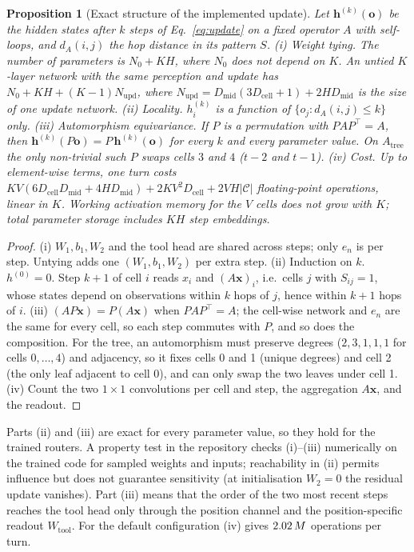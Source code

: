 \documentclass[10pt,twocolumn,letterpaper]{article}
\newtheorem{proposition}{Proposition}
\begin{document}
\begin{proposition}[Exact structure of the implemented update]\label{prop:structure}
Let $\mathbf h^{(k)}(\mathbf o)$ be the hidden states after $k$ steps of Eq.~\eqref{eq:update} on a fixed operator $A$ with self-loops, and $d_A(i,j)$ the hop distance in its pattern $S$.
(i) \emph{Weight tying.} The number of parameters is $N_0 + KH$, where $N_0$ does not depend on $K$. An untied $K$-layer network with the same perception and update has $N_0 + KH + (K{-}1)N_{\text{upd}}$, where $N_{\text{upd}} = D_{\text{mid}}(3D_{\text{cell}}+1) + 2H D_{\text{mid}}$ is the size of one update network.
(ii) \emph{Locality.} $h_i^{(k)}$ is a function of $\{o_j : d_A(i,j)\le k\}$ only.
(iii) \emph{Automorphism equivariance.} If $P$ is a permutation with $PAP^{\top}=A$, then $\mathbf h^{(k)}(P\mathbf o) = P\,\mathbf h^{(k)}(\mathbf o)$ for every $k$ and every parameter value. On $A_{\text{tree}}$ the only non-trivial such $P$ swaps cells $3$ and $4$ ($t{-}2$ and $t{-}1$).
(iv) \emph{Cost.} Up to element-wise terms, one turn costs $K V (6D_{\text{cell}}D_{\text{mid}} + 4HD_{\text{mid}}) + 2KV^2 D_{\text{cell}} + 2VH|\mathcal C|$ floating-point operations, linear in $K$. Working activation memory for the $V$ cells does not grow with $K$; total parameter storage includes $KH$ step embeddings.
\end{proposition}
\begin{proof}
(i) $W_1,b_1,W_2$ and the tool head are shared across steps; only $e_n$ is per step. Untying adds one $(W_1,b_1,W_2)$ per extra step. (ii) Induction on $k$. $h^{(0)}=0$. Step $k{+}1$ of cell $i$ reads $x_i$ and $(A\mathbf x)_i$, i.e.\ cells $j$ with $S_{ij}=1$, whose states depend on observations within $k$ hops of $j$, hence within $k{+}1$ hops of $i$. (iii) $(A P\mathbf x) = P(A\mathbf x)$ when $PAP^{\top}=A$; the cell-wise network and $e_n$ are the same for every cell, so each step commutes with $P$, and so does the composition. For the tree, an automorphism must preserve degrees ($2,3,1,1,1$ for cells $0,\dots,4$) and adjacency, so it fixes cells 0 and 1 (unique degrees) and cell 2 (the only leaf adjacent to cell 0), and can only swap the two leaves under cell 1. (iv) Count the two $1\times1$ convolutions per cell and step, the aggregation $A\mathbf x$, and the readout.
\end{proof}
Parts (ii) and (iii) are exact for every parameter value, so they hold for the trained routers. A property test in the repository checks (i)--(iii) numerically on the trained code for sampled weights and inputs; reachability in (ii) permits influence but does not guarantee sensitivity (at initialisation $W_2{=}0$ the residual update vanishes). Part (iii) means that the order of the two most recent steps reaches the tool head only through the position channel and the position-specific readout $W_{\text{tool}}$. For the default configuration (iv) gives $2.02\,M$ operations per turn.
\end{document}
